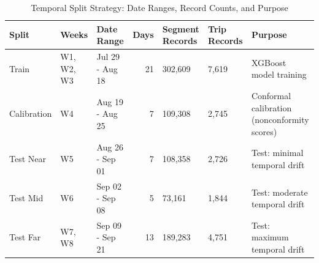 \begin{table}
\caption{Temporal Split Strategy: Date Ranges, Record Counts, and Purpose}
\label{tab:temporal_splits}
\begin{tabular}{lllrlll}
\toprule
Split & Weeks & Date Range & Days & Segment Records & Trip Records & Purpose \\
\midrule
Train & W1, W2, W3 & Jul 29 - Aug 18 & 21 & 302,609 & 7,619 & XGBoost model training \\
Calibration & W4 & Aug 19 - Aug 25 & 7 & 109,308 & 2,745 & Conformal calibration (nonconformity scores) \\
Test Near & W5 & Aug 26 - Sep 01 & 7 & 108,358 & 2,726 & Test: minimal temporal drift \\
Test Mid & W6 & Sep 02 - Sep 08 & 5 & 73,161 & 1,844 & Test: moderate temporal drift \\
Test Far & W7, W8 & Sep 09 - Sep 21 & 13 & 189,283 & 4,751 & Test: maximum temporal drift \\
\bottomrule
\end{tabular}
\end{table}
